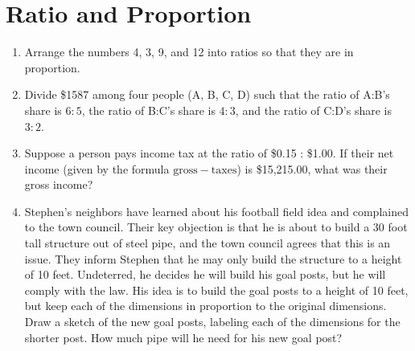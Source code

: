 \documentclass{article}
\begin{document}
\section*{Ratio and Proportion}
\begin{enumerate}
   \item Arrange the numbers 4, 3, 9, and 12 into ratios so that they are in proportion.
   
   \item Divide \$1587 among four people (A, B, C, D) such that the ratio of A:B's share 
   is $6:5$, the ratio of B:C's share is $4:3$, and the ratio of C:D's share is $3:2$.
   
   \item Suppose a person pays income tax at the ratio of \$0.15 : \$1.00.  If their net 
   income (given by the formula $\mathrm{gross} - \mathrm{taxes}$) is \$15,215.00, what was their 
   gross income?
   
   \item Stephen's neighbors have learned about his football field idea and complained
   to the town council. Their key objection is that he is about to build a 
   30 foot tall structure out of steel pipe, and the town council agrees that this is an
   issue.  They inform Stephen that he may only build the structure to a height of 10 feet.  
   Undeterred, he decides he will build his goal posts, but he will comply with the law.  
   His idea is to build the goal posts to a height of 10 feet, but keep each of the
   dimensions in proportion to the original dimensions.  Draw a sketch of the new goal
   posts, labeling each of the dimensions for the shorter post. How much pipe will he
   need for his new goal post?
\end{enumerate}
\end{document}
